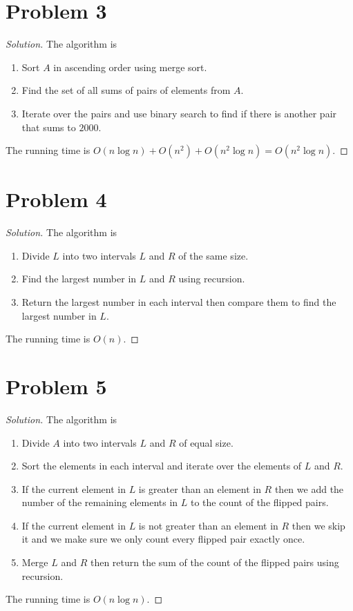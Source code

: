 \documentclass[12pt, letterpaper]{article}
\newenvironment{solution}{\begin{proof}[Solution]}{\end{proof}}
\begin{document}
\section{Problem 3}
\begin{solution}
    The algorithm is
    \begin{enumerate}
        \item Sort \(A\) in ascending order using merge sort.
        \item Find the set of all sums of pairs of elements from \(A\).
        \item Iterate over the pairs and use binary search to find if there is another pair that sums to \(2000\).
    \end{enumerate}
    The running time is \(O(n\log n)+O(n^2)+O(n^2\log n)=O(n^2\log n)\).
\end{solution}
\section{Problem 4}
\begin{solution}
    The algorithm is
    \begin{enumerate}
        \item Divide \(L\) into two intervals \(L\) and \(R\) of the same size. 
        \item Find the largest number in \(L\) and \(R\) using recursion.
        \item Return the largest number in each interval then compare them to find the largest number in \(L\).
    \end{enumerate}
    The running time is \(O(n)\).
\end{solution}
\section{Problem 5}
\begin{solution}
    The algorithm is
    \begin{enumerate}
        \item Divide \(A\) into  two intervals \(L\) and \(R\) of equal size.
        \item Sort the elements in each interval and iterate over the elements of \(L\) and \(R\).
        \item If the current element in \(L\) is greater than an element in \(R\)
        then we add the number of the remaining elements in \(L\) to the count of the flipped pairs.
        \item If the current element in \(L\) is not greater than an element in \(R\) then we skip it
        and we make sure we only count every flipped pair exactly once.
        \item Merge \(L\) and \(R\) then return the sum of the count of the flipped pairs using recursion.
    \end{enumerate}
    The running time is \(O(n\log n)\).
\end{solution}
\end{document}
